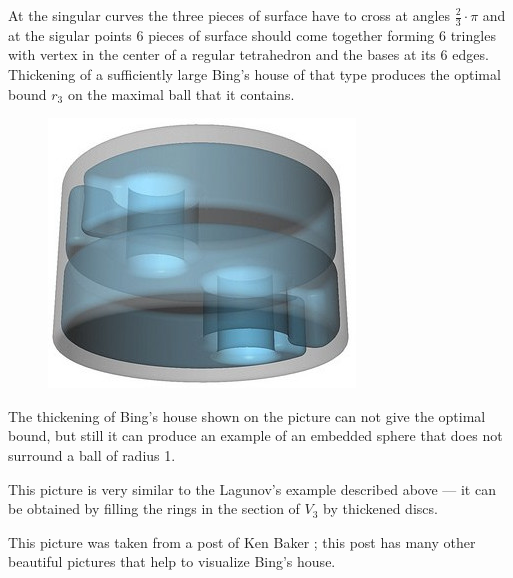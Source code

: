 At the singular curves the three pieces of surface have to cross at angles $\tfrac23\cdot\pi$ and at the sigular points 6 pieces of surface should come together forming 6 tringles with vertex in the center of a regular tetrahedron and the bases at its 6 edges.
Thickening of a sufficiently large Bing's house of that type produces the optimal bound $r_3$ on the maximal ball that it contains.

\begin{figure}
\vskip-0mm
\centering
\includegraphics[scale=.45]{pics/thickened-bing's-house}
\vskip-0mm
\end{figure}

The thickening of Bing's house shown on the picture can not give the optimal bound,
but still it can produce an example of an embedded sphere that does not surround a ball of radius 1.

This picture is very similar to the Lagunov's example described above --- it can be obtained by filling the rings in the section of $V_3$ by thickened discs. 

This picture was taken from a post of Ken Baker \cite{baker};
this post has many other beautiful pictures that help to visualize Bing's house.

